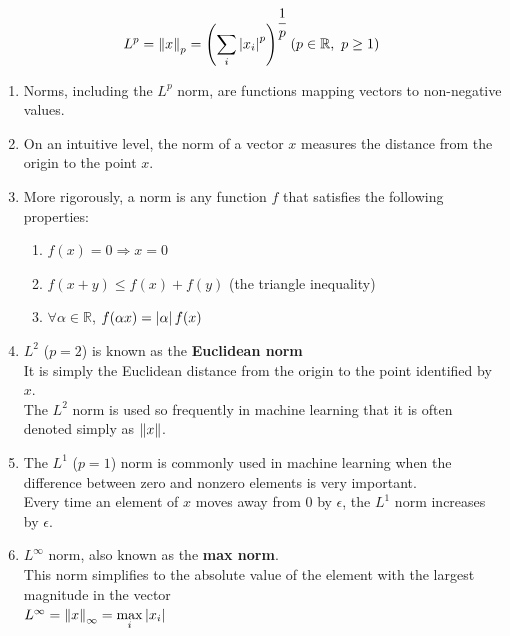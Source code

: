 \[
    \hfill
    L^p
    = \dnorm{x}_p
    = \dParenBrac{\dsum_{i} \dabs{x_i}^p}^{\dfrac{1}{p}}
    \hfill
    ( p \in \mathbb{R},\ p\geq1 )
\]

\begin{enumerate}[itemsep=0.1cm]
    \item Norms, including the $L^p$ norm, are functions mapping vectors to non-negative values. 
    
    \item On an intuitive level, the norm of a vector $x$ measures the distance from the origin to the point $x$. 
    
    \item More rigorously, a norm is any function $f$ that satisfies the following properties:
    \begin{enumerate}
        \item $f(x) = 0 \Rightarrow x = 0$

        \item $f(x+y) \leq f(x) + f(y)$ (the triangle inequality)

        \item 
        $\forall \alpha \in \mathbb{R}$, 
        $f(\alpha x) = \left| \alpha \right|f(x)$
    \end{enumerate}

    \item $L^2$ ($p=2$) is known as the \textbf{Euclidean norm}\\
    It is simply the Euclidean distance from the origin to the point identified by $x$. \\
    The $L^2$ norm is used so frequently in machine learning that it is often denoted simply as $\left\| x \right\|$.

    \item The $L^1$ ($p=1$) norm is commonly used in machine learning when the difference between zero and nonzero elements is very important.\\
    Every time an element of $x$ moves away from $0$ by $\epsilon$, the $L^1$ norm increases by $\epsilon$.

    \item $L^\infty$ norm, also known as the \textbf{max norm}.\\
    This norm simplifies to the absolute value of the element with the largest magnitude in the vector\\
    $L^\infty = \left\| x \right\|_\infty = \displaystyle\max_i \left| x_i \right|$

    
\end{enumerate}


